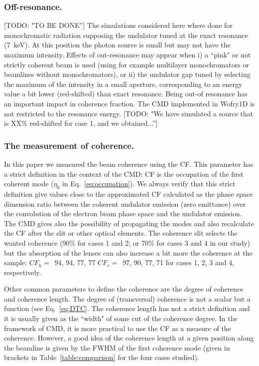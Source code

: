 \documentclass{iucr}              %
\newcommand{\todo}[1]{{\color{red}[TODO: "#1'']}}
\begin{document}
\subsubsection{Off-resonance.}\todo{TO BE DONE} The simulations considered here where done for monochromatic radiation supposing the undulator tuned at the exact resonance (\SI{7}{keV}). At this position the photon source is small but may not have the maximum intensity. Effects of out-resonance may appear when i) a ``pink" or not strictly coherent beam is used (using for example multilayer monochromators or beamlines without monochromators), or ii) the undulator gap tuned by selecting the maximum of the intensity in a small aperture, corresponding to an energy value a bit lower (red-shifted) than exact resonance. Being out-of resonance has an important impact in coherence fraction. The CMD implemented in Wofry1D is not restricted to the resonance energy. 
\todo{We have simulated a source that is XX\% red-shifted for case 1, and we obtained...}

\subsubsection{The measurement of coherence.} In this paper we measured the beam coherence using the CF. This parameter has a strict definition in the context of the CMD: CF is the occupation of the first coherent mode ($\eta_0$ in Eq.~\ref{eq:occupation}). We always verify that this strict definition give values close to the approximated CF  calculated as the phase space dimension ratio between the coherent undulator emission (zero emittance) over the convolution of the electron beam phase space and the undulator emission. The CMD gives also the possibility of propagating the modes and also recalculate the CF after the slit or other optical elements. The coherence slit selects the wanted coherence (90\% for cases 1 and 2; or 70\% for cases 3 and 4 in our study) but the absorption of the lenses can also increase a bit more the coherence at the sample: $CF_h=$~94, 94, 77, 77 $CF_v=$~97, 90, 77, 71 for cases 1, 2, 3 and 4, respectively. 

Other common parameters to define the coherence are the degree of coherence and coherence length. The degree of (transversal) coherence is not a scalar but a function (see Eq.~\ref{eq:DTC}. The coherence length has not a strict definition and it is usually given as the ``width" of some cut of the coherence degree. In the framework of CMD, it is more practical to use the CF as a measure of the coherence. However, a good idea of the coherence length at a given position along the beamline is given by the FWHM of the first coherence mode (given in brackets in Table~\ref{table:comparison} for the four cases studied).    
\end{document}
